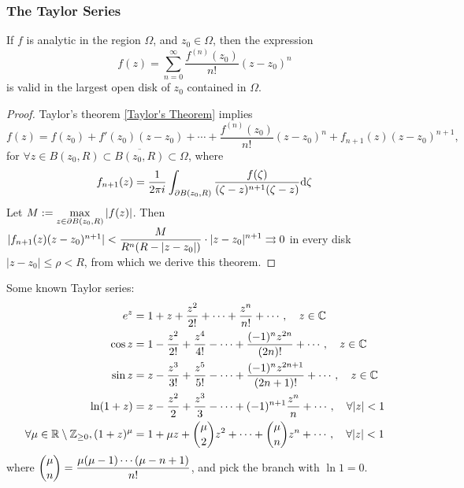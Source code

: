 
\subsubsection{The Taylor Series}
\begin{theorem}\label{thm:5.1.2:Theorem of Taylor Series}
    If  $ f  $ is analytic in the region  $ \Omega  $, and  $ z_0\in \Omega  $, then the expression 
    \begin{equation}
        f(z)=\sum_{n=0}^\infty \frac{f^{(n)}(z_0)}{n!}(z-z_0)^n
    \end{equation}
    is valid in the largest open disk of  $ z_0 $ contained in   $ \Omega  $.
\end{theorem}
\begin{proof}
    Taylor's theorem \ref{Taylor's Theorem} implies 
    \begin{equation}
        f(z)=f(z_0)+f'(z_0)(z-z_0)+\cdots+\frac{f^{(n)}(z_0)}{n!}(z-z_0)^n+f_{n+1}(z)(z-z_0)^{n+1},\,
    \end{equation}
    for  $ \forall z\in B(z_0,R)\subset \overline{B(z_0,R)}\subset \Omega $, where  
    \begin{equation}
        f_{n+1}(z)=\displaystyle\frac{1}{2\pi i}\int_{\partial B(z_0,R)}\frac{f(\zeta)}{(\zeta-z)^{n+1}(\zeta-z)}\mathrm{d}\zeta 
    \end{equation}
    Let  $ M:=\displaystyle\max_{z\in\partial B(z_0,R)}|f(z)| $. Then  $ |f_{n+1}(z)(z-z_0)^{n+1}|<\displaystyle\frac{M}{R^n(R-|z-z_0|)}\cdot |z-z_0|^{n+1}\rightrightarrows 0$ in every disk  $ |z-z_0| \leq \rho<R $, from which we derive this theorem.
\end{proof}


Some known Taylor series:
\begin{equation}
    \begin{aligned}\label{eq:5.1.2Taylor Series of some functions}
        e^z&=1+z+\frac{z^2}{2!}+\cdots+\frac{z^n}{n!}+\cdots,\quad z\in \mathbb C\\
        \cos z&=1-\frac{z^2}{2!}+\frac{z^4}{4!}-\cdots+\frac{(-1)^n z^{2n}}{(2n)!}+\cdots,\quad z\in \mathbb C\\
        \sin z &= z-\frac{z^3}{3!}+\frac{z^5}{5!}-\cdots+\frac{(-1)^n z^{2n+1}}{(2n+1)!}+\cdots,\quad z\in \mathbb C\\
        \ln  (1+z)&=z-\frac{z^2}{2}+\frac{z^3}{3}-\cdots+(-1)^{n+1}\frac{z^n}{n}+\cdots,\quad \forall |z|<1\\
        \forall \mu\in \mathbb R\setminus\mathbb Z_{\geq 0},(1+z)^{\mu}&=1+\mu z+\binom{\mu}{2}z^2+\cdots+\binom{\mu }{n}z^n+\cdots,\quad \forall |z|<1
    \end{aligned}
\end{equation}
where  $ \displaystyle\binom{\mu }{n}=\frac{\mu (\mu -1)\cdots(\mu -n+1)}{n!} $, and pick the branch with  $ \ln 1=0 $.

